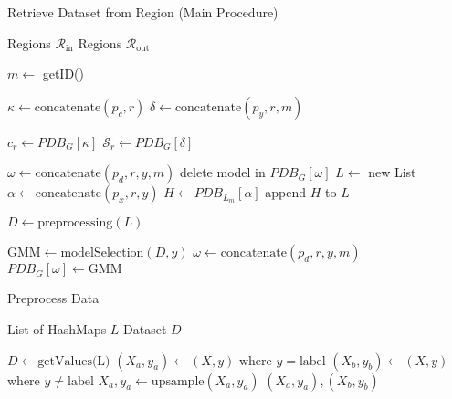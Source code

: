 \documentclass[../../main.tex]{subfiles}
\begin{document}
\begin{algorithm}
    \caption{Retrieve Dataset from Region (Main Procedure)}
    \label{alg:generative_fitting}
 
    \begin{algorithmic}[1]
        \REQUIRE Regions $\mathcal{R}_{\text{in}}$
        \ENSURE Regions $\mathcal{R}_{\text{out}}$

        \STATE $m \leftarrow$ getID()

            \STATE $\kappa \leftarrow \text{concatenate}(p_c, r)$
            \STATE $\delta \leftarrow \text{concatenate}(p_y, r, m)$

            \STATE $c_r \leftarrow PDB_G[\kappa]$
            \STATE $\mathcal{S}_r \leftarrow PDB_G[\delta]$ %

                    \STATE $\omega \leftarrow \text{concatenate}(p_d, r, y, m)$ 
                    \STATE delete model in $PDB_G[\omega]$
                \ENDFOR
            \ELSE
                \STATE $L \leftarrow$ new List
                    \STATE $\alpha \leftarrow \text{concatenate}(p_x, r, y)$
                    \STATE $H \leftarrow PDB_{L_m}[\alpha]$
                    \STATE append $H$ to $L$
                \ENDFOR

                \STATE $D \leftarrow \text{preprocessing}(L)$

                    \STATE $\text{GMM} \leftarrow \text{modelSelection}(D, y)$
                    \STATE $\omega \leftarrow \text{concatenate}(p_d, r, y, m)$ 
                    \STATE $PDB_G[\omega] \leftarrow \text{GMM}$
                \ENDFOR
            \ENDIF
            


        \ENDFOR
    \end{algorithmic}
 \end{algorithm}


 \begin{algorithm}
    \caption{Preprocess Data}
    \label{alg:data_preprocessing}
 
    \begin{algorithmic}[1]
        \REQUIRE List of HashMaps $L$
        \ENSURE Dataset $D$
        
        \STATE $D \leftarrow \text{getValues(L)}$
                \STATE {}
                \STATE $(X_a, y_a) \leftarrow (X, y)$ where $y=\text{label}$ 
                \STATE $(X_b, y_b) \leftarrow (X, y)$ where $y \neq \text{label}$
                    \STATE $X_a, y_a \leftarrow \text{upsample}(X_a, y_a)$
                \ENDIF
            \ENDIF
        \ENDFOR
        \RETURN $(X_a, y_a), (X_b, y_b)$
    \end{algorithmic}
 \end{algorithm}
\end{document}
